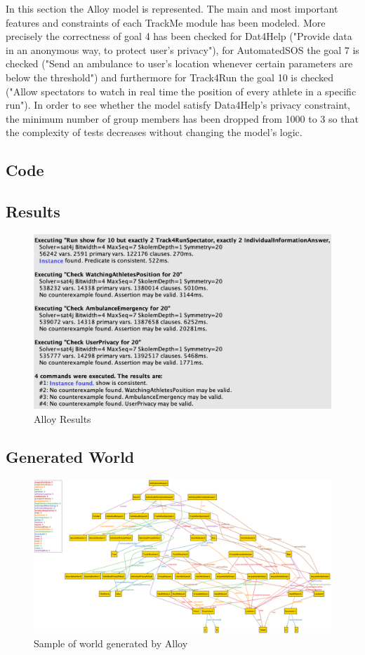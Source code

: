 In this section the Alloy model is represented. The main and most important features and constraints of each TrackMe module has been modeled. More precisely the correctness of goal 4 has been checked for Dat4Help ("Provide data in an anonymous way, to protect user’s privacy"), for AutomatedSOS the goal 7 is checked ("Send an ambulance to user’s location whenever certain parameters are below the threshold") and furthermore for Track4Run the goal 10 is checked ("Allow spectators to watch in real time the position of every athlete in a specific run").
\bigbreak
\noindent
In order to see whether the model satisfy Data4Help's privacy constraint, the minimum number of group members has been dropped from 1000 to 3 so that the complexity of tests decreases without changing the model's logic. 

\subsection{Code}

\subsection{Results}
\begin{figure}[H]
\centering
\includegraphics[scale=0.5]{Images/alloyResult.png}
\caption{Alloy Results}
\end{figure}
\clearpage
\subsection{Generated World}
\begin{figure}[H]
\centering
\includegraphics[scale=0.47, angle=-90,origin=c]{Images/alloyGeneratedWorld.png}
\caption{Sample of world generated by Alloy}
\end{figure}